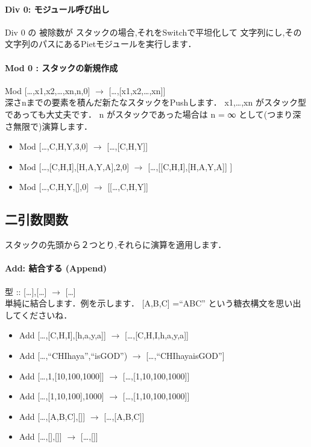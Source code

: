 \paragraph{Div 0: モジュール呼び出し}

Div 0 の 被除数が スタックの場合,それをSwitchで平坦化して
文字列にし,その文字列のパスにあるPietモジュールを実行します．

\paragraph{Mod 0 : スタックの新規作成}

Mod {[}\ldots{},x1,x2,\ldots{},xn,n,0{]} $\to$
{[}\ldots{},{[}x1,x2,\ldots{},xn{]}{]}\\深さnまでの要素を積んだ新たなスタックをPushします．
x1,\ldots{},xn がスタック型であっても大丈夫です． n
がスタックであった場合は n = ∞ として(つまり深さ無限で)演算します．

\begin{itemize}
\item
  Mod {[}\ldots{},C,H,Y,3,0{]} $\to$
  {[}\ldots{},{[}C,H,Y{]}{]}
\item
  Mod {[}\ldots{},{[}C,H,I{]},{[}H,A,Y,A{]},2,0{]} $\to$
  {[}\ldots{},{[}{[}C,H,I{]},{[}H,A,Y,A{]}{]} {]}
\item
  Mod {[}\ldots{},C,H,Y,{[}{]},0{]} $\to$
  {[}{[}\ldots{},C,H,Y{]}{]}
\end{itemize}

\subsection{二引数関数}

スタックの先頭から２つとり,それらに演算を適用します．

\paragraph{Add: 結合する (Append)}

型 :: {[}\ldots{}{]},{[}\ldots{}{]} $\to$
{[}\ldots{}{]}\\単純に結合します．例を示します． {[}A,B,C{]} =``ABC''
という糖衣構文を思い出してくださいね．

\begin{itemize}
\item
  Add {[}\ldots{},{[}C,H,I{]},{[}h,a,y,a{]}{]} $\to$
  {[}\ldots{},{[}C,H,I,h,a,y,a{]}{]}
\item
  Add {[}\ldots{},``CHIhaya'',``isGOD'') $\to$
  {[}\ldots{},``CHIhayaisGOD''{]}
\item
  Add {[}\ldots{},1,{[}10,100,1000{]}{]} $\to$
  {[}\ldots{},{[}1,10,100,1000{]}{]}
\item
  Add {[}\ldots{},{[}1,10,100{]},1000{]} $\to$
  {[}\ldots{},{[}1,10,100,1000{]}{]}
\item
  Add {[}\ldots{},{[}A,B,C{]},{[}{]}{]} $\to$
  {[}\ldots{},{[}A,B,C{]}{]}
\item
  Add {[}\ldots{},{[}{]},{[}{]}{]} $\to$ {[}\ldots{},{[}{]}{]}
\end{itemize}

